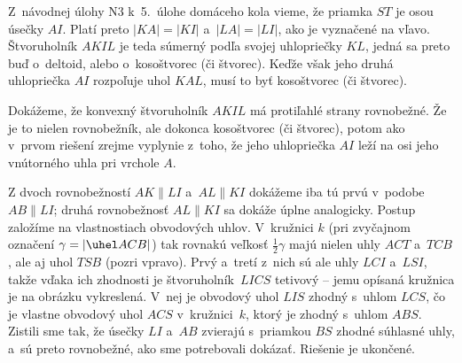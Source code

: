 {%
Z~návodnej úlohy N3 k~5.~úlohe domáceho kola vieme, že priamka $ST$ je
osou úsečky $AI$.
Platí preto $|KA|=|KI|$ a~$|LA|=|LI|$, ako je vyznačené na
\obr{} vľavo. Štvoruholník $AKIL$ je teda súmerný
podľa svojej uhlopriečky $KL$, jedná sa preto buď
o~deltoid,
alebo o~kosoštvorec (či štvorec).
Keďže však jeho druhá uhlopriečka $AI$ rozpoľuje uhol $KAL$,
musí to byť kosoštvorec (či štvorec).
%

\Jres
Dokážeme, že konvexný štvoruholník $AKIL$ má protiľahlé strany
rovnobežné. Že je to nielen rovnobežník, ale
dokonca kosoštvorec (či štvorec), potom ako v~prvom riešení
zrejme vyplynie z~toho, že jeho uhlopriečka $AI$ leží na osi
jeho vnútorného uhla pri vrchole $A$.

Z dvoch rovnobežností $AK\parallel LI$ a~$AL\parallel KI$
dokážeme iba tú prvú v~podobe $AB\parallel LI$; druhá rovnobežnosť
$AL\parallel KI$ sa dokáže úplne analogicky.
Postup založíme na vlastnostiach obvodových uhlov. V~kružnici $k$
(pri zvyčajnom označení $\gamma=|\uhel ACB|$) tak
rovnakú veľkosť $\frac12\gamma$ majú nielen uhly $ACT$ a~$TCB$,
ale aj uhol $TSB$ (pozri  vpravo).
Prvý a~tretí z~nich sú ale uhly $LCI$ a~$LSI$,
takže vďaka ich zhodnosti je štvoruholník~$LICS$ tetivový --
jemu opísaná kružnica je na obrázku vykreslená. V~nej je
obvodový uhol $LIS$ zhodný s~uhlom $LCS$, čo je
vlastne obvodový uhol $ACS$ v~kružnici~$k$, ktorý je zhodný
s~uhlom $ABS$. Zistili sme tak, že úsečky $LI$ a~$AB$
zvierajú s~priamkou $BS$ zhodné súhlasné uhly, a~sú preto
rovnobežné, ako sme potrebovali dokázať. Riešenie je ukončené.

}
